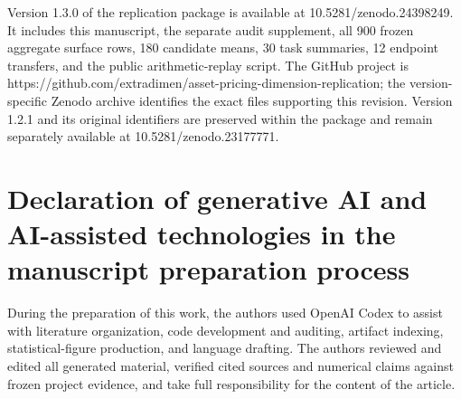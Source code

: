 \documentclass{rQUF2e}
\newcommand{\href}[2]{#2}
\providecommand{\theHtable}{}
\begin{document}
Version 1.3.0 of the replication package is available at \href{https://doi.org/10.5281/zenodo.24398249}{10.5281/zenodo.24398249}. It includes this manuscript, the separate audit supplement, all 900 frozen aggregate surface rows, 180 candidate means, 30 task summaries, 12 endpoint transfers, and the public arithmetic-replay script. The GitHub project is \href{https://github.com/extradimen/asset-pricing-dimension-replication}{https://github.com/extradimen/asset-pricing-dimension-replication}; the version-specific Zenodo archive identifies the exact files supporting this revision. Version 1.2.1 and its original identifiers are preserved within the package and remain separately available at \href{https://doi.org/10.5281/zenodo.23177771}{10.5281/zenodo.23177771}.

\section*{Declaration of generative AI and AI-assisted technologies in the manuscript preparation process}
During the preparation of this work, the authors used OpenAI Codex to assist with literature organization, code development and auditing, artifact indexing, statistical-figure production, and language drafting. The authors reviewed and edited all generated material, verified cited sources and numerical claims against frozen project evidence, and take full responsibility for the content of the article.

\begingroup
\small
\raggedright
\setlength{\bibsep}{3pt}


\endgroup
\appendix
\setcounter{table}{0}
\renewcommand{\theHtable}{A.\arabic{table}}

\end{document}
